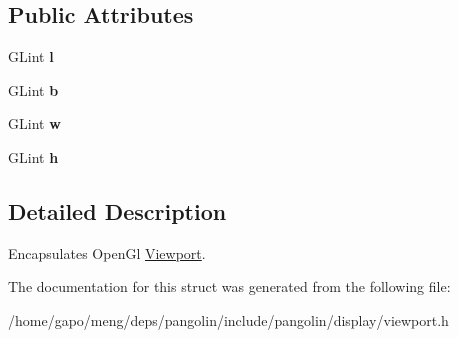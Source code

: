 \subsection*{Public Attributes}
\begin{DoxyCompactItemize}
\item 
G\+Lint {\bfseries l}\hypertarget{structpangolin_1_1_viewport_af90b9cafd0ba6419d975c524924fcd2c}{}\label{structpangolin_1_1_viewport_af90b9cafd0ba6419d975c524924fcd2c}

\item 
G\+Lint {\bfseries b}\hypertarget{structpangolin_1_1_viewport_af5d5b8db188b9012580add7c6bf89d7a}{}\label{structpangolin_1_1_viewport_af5d5b8db188b9012580add7c6bf89d7a}

\item 
G\+Lint {\bfseries w}\hypertarget{structpangolin_1_1_viewport_ab5ae7c6f4649aeb4ea2831cb83b15d5a}{}\label{structpangolin_1_1_viewport_ab5ae7c6f4649aeb4ea2831cb83b15d5a}

\item 
G\+Lint {\bfseries h}\hypertarget{structpangolin_1_1_viewport_a5b8c5220b5e6bfc68644c7ddb05096d5}{}\label{structpangolin_1_1_viewport_a5b8c5220b5e6bfc68644c7ddb05096d5}

\end{DoxyCompactItemize}


\subsection{Detailed Description}
Encapsulates Open\+Gl \hyperlink{structpangolin_1_1_viewport}{Viewport}. 

The documentation for this struct was generated from the following file\+:\begin{DoxyCompactItemize}
\item 
/home/gapo/meng/deps/pangolin/include/pangolin/display/viewport.\+h\end{DoxyCompactItemize}
